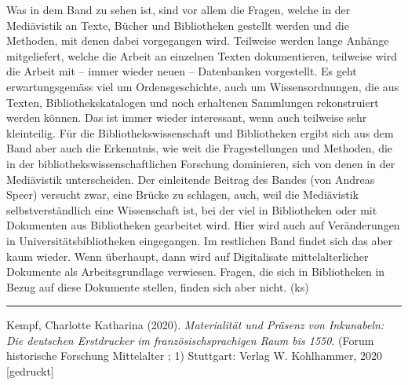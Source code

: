 \documentclass[a4paper,
fontsize=11pt,
oneside,
numbers=noperiodatend,
parskip=half-,
bibliography=totoc,
final
]{scrartcl}
\begin{document}
Was in dem Band zu sehen ist, sind vor allem die Fragen, welche in der
Mediävistik an Texte, Bücher und Bibliotheken gestellt werden und die
Methoden, mit denen dabei vorgegangen wird. Teilweise werden lange
Anhänge mitgeliefert, welche die Arbeit an einzelnen Texten
dokumentieren, teilweise wird die Arbeit mit -- immer wieder neuen --
Datenbanken vorgestellt. Es geht erwartungsgemäss viel um
Ordensgeschichte, auch um Wissensordnungen, die aus Texten,
Bibliothekskatalogen und noch erhaltenen Sammlungen rekonstruiert werden
können. Das ist immer wieder interessant, wenn auch teilweise sehr
kleinteilig. Für die Bibliothekswissenschaft und Bibliotheken ergibt
sich aus dem Band aber auch die Erkenntnis, wie weit die Fragestellungen
und Methoden, die in der bibliothekswissenschaftlichen Forschung
dominieren, sich von denen in der Mediävistik unterscheiden. Der
einleitende Beitrag des Bandes (von Andreas Speer) versucht zwar, eine
Brücke zu schlagen, auch, weil die Mediävistik selbstverständlich eine
Wissenschaft ist, bei der viel in Bibliotheken oder mit Dokumenten aus
Bibliotheken gearbeitet wird. Hier wird auch auf Veränderungen in
Universitätsbibliotheken eingegangen. Im restlichen Band findet sich das
aber kaum wieder. Wenn überhaupt, dann wird auf Digitalisate
mittelalterlicher Dokumente als Arbeitsgrundlage verwiesen. Fragen, die
sich in Bibliotheken in Bezug auf diese Dokumente stellen, finden sich
aber nicht. (ks)

\begin{center}\rule{0.5\linewidth}{0.5pt}\end{center}

Kempf, Charlotte Katharina (2020). \emph{Materialität und Präsenz von
Inkunabeln: Die deutschen Erstdrucker im französischsprachigen Raum bis
1550}. (Forum historische Forschung Mittelalter ; 1) Stuttgart: Verlag
W. Kohlhammer, 2020 {[}gedruckt{]}
\end{document}
